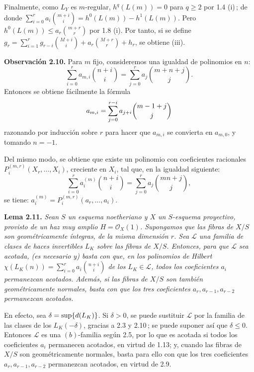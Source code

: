 Finalmente, como \(L_Y\) es \(m\)-regular, \(h^q(L(m))=0\) para \(q\ge2\)
por 1.4 (i)\,; de donde
\(\sum_{i=0}^{r}a_i\binom{m+i}{i}=h^0(L(m))-h^1(L(m))\). Pero
\(h^0(L(m))\le a_r\binom{m+r}{r}\) por 1.8 (i). Por tanto, si se define
\(g_r=\sum_{i=1}^{r}g_{r-i}\binom{M+i}{i}+a_r\binom{M+r}{r}+h_r\), se
obtiene (iii).

\textbf{Observación 2.10.} Para \(m\) fijo, consideremos una igualdad de
polinomios en \(n\):
\[
\sum_{i=0}^{r}a_{m,i}\binom{n+i}{i}
=
\sum_{j=0}^{r}a_j\binom{m+n+j}{j}.
\]
Entonces se obtiene fácilmente la fórmula
\[
a_{m,i}=\sum_{j=0}^{r-i}a_{j+i}\binom{m-1+\sisi{i}{j}}{j} %
\]
razonando por inducción sobre \(r\) para hacer que \(a_{m,i}\) se convierta
en \(a_{m,0}\), y tomando \(n=-1\).

Del mismo modo, se obtiene que existe un polinomio con coeficientes racionales
\(P_i^{(m,r)}(X_r,\ldots,X_i)\), creciente en \(X_i\), tal que, en la
igualdad siguiente:
\[
\sum_{i=0}^{r}a_i^{(m)}\binom{n+i}{i}
=
\sum_{j=0}^{r}a_j\binom{mn+j}{j},
\]
se tiene: \(a_i^{(m)}=P_i^{(m,r)}(a_r,\ldots,a_i)\).

\textbf{Lema 2.11.} \emph{Sean \(S\) un esquema noetheriano y \(X\) un
\(S\)-esquema proyectivo, provisto de un haz muy amplio
\(H=\mathcal O_X(1)\). Supongamos que las fibras de \(X/S\) son
geométricamente íntegras, de la misma dimensión \(r\). Sea \(\mathcal L\)
una familia de clases de haces invertibles \(L_K\) sobre las fibras de
\(X/S\). Entonces, para que \(\mathcal L\) sea acotada, (es necesario y)
basta con que, en los polinomios de Hilbert
\(\chi(L_K(n))=\sum_{i=0}^{r}a_i\binom{n+i}{i}\) de los
\(L_K\in\mathcal L\), todos los coeficientes \(a_i\) permanezcan acotados.
Además, si las fibras de \(X/S\) son también geométricamente normales, basta
con que los tres coeficientes \(a_r,a_{r-1},a_{r-2}\) permanezcan acotados.}

En efecto, sea \(\delta=\sisi{\operatorname{supp}}{\sup}\{d(L_K)\}\). Si \(\delta>0\), %
se puede sustituir \(\mathcal L\) por la familia de las clases de los
\(L_K(-\delta)\), gracias a 2.3 y 2.10\,; se puede suponer así que
\(\delta\le0\). Entonces \(\mathcal L\) es una \((b)\)-familia según 2.5,
por lo que es acotada si todos los coeficientes \(a_i\) permanecen acotados,
en virtud de 1.13; y, cuando las fibras de \(X/S\) son geométricamente
normales, basta para ello con que los tres coeficientes
\(a_r,a_{r-1},a_{r-2}\) permanezcan acotados, en virtud de 2.9.


